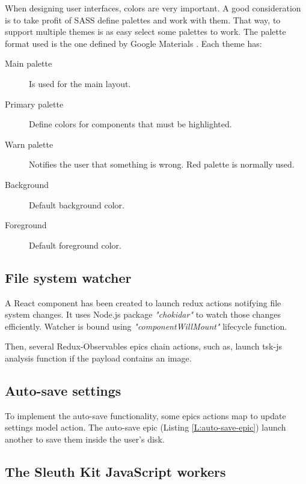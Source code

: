 When designing user interfaces, colors are very important. A good consideration
is to take profit of SASS define palettes and work with them. That way, to
support multiple themes is as easy select some palettes to work. The palette
format used is the one defined by Google Materials \cite{google-materials-web}.
Each theme has:

\begin{description}
	\item[Main palette] Is used for the main layout.
	\item[Primary palette] Define colors for components that must be
	highlighted.
	\item[Warn palette] Notifies the user that something is wrong. Red palette
	is normally used.
	\item[Background] Default background color.
	\item[Foreground] Default foreground color.
\end{description}


\subsection{File system watcher}

A React component has been created to launch redux actions notifying file
system changes. It uses Node.js package \textit{"chokidar"} to watch those
changes efficiently. Watcher is bound using \textit{"componentWillMount"}
lifecycle function.

Then, several Redux-Observables epics chain actions, such as, launch tsk-js
analysis function if the payload contains an image.

\subsection{Auto-save settings}

To implement the auto-save functionality, some epics actions map to update
settings model action. The auto-save epic (Listing \ref{L:auto-save-epic})
launch another to save them inside the user's disk.

\begin{codefigure}
\end{codefigure}

\subsection{The Sleuth Kit JavaScript workers}

